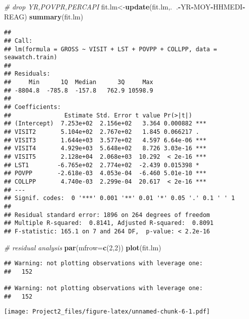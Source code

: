 \documentclass[]{article}
\newenvironment{Shaded}{\begin{snugshade}}{\end{snugshade}}
\newcommand{\KeywordTok}[1]{\textcolor[rgb]{0.13,0.29,0.53}{\textbf{#1}}}
\newcommand{\DataTypeTok}[1]{\textcolor[rgb]{0.13,0.29,0.53}{#1}}
\newcommand{\DecValTok}[1]{\textcolor[rgb]{0.00,0.00,0.81}{#1}}
\newcommand{\CommentTok}[1]{\textcolor[rgb]{0.56,0.35,0.01}{\textit{#1}}}
\newcommand{\OperatorTok}[1]{\textcolor[rgb]{0.81,0.36,0.00}{\textbf{#1}}}
\newcommand{\NormalTok}[1]{#1}
\begin{document}
\begin{Shaded}
\begin{Highlighting}[]
\CommentTok{# drop YR,POVPR,PERCAPI}
\NormalTok{fit.lm<-}\KeywordTok{update}\NormalTok{(fit.lm,.}\OperatorTok{~}\NormalTok{.}\OperatorTok{-}\NormalTok{YR}\OperatorTok{-}\NormalTok{MOY}\OperatorTok{-}\NormalTok{HHMEDI}\OperatorTok{-}\NormalTok{REAG)}
\KeywordTok{summary}\NormalTok{(fit.lm)}
\end{Highlighting}
\end{Shaded}

\begin{verbatim}
## 
## Call:
## lm(formula = GROSS ~ VISIT + LST + POVPP + COLLPP, data = seawatch.train)
## 
## Residuals:
##     Min      1Q  Median      3Q     Max 
## -8804.8  -785.8  -157.8   762.9 10598.9 
## 
## Coefficients:
##               Estimate Std. Error t value Pr(>|t|)    
## (Intercept)  7.253e+02  2.156e+02   3.364 0.000882 ***
## VISIT2       5.104e+02  2.767e+02   1.845 0.066217 .  
## VISIT3       1.644e+03  3.577e+02   4.597 6.64e-06 ***
## VISIT4       4.929e+03  5.648e+02   8.726 3.03e-16 ***
## VISIT5       2.128e+04  2.068e+03  10.292  < 2e-16 ***
## LST1        -6.765e+02  2.774e+02  -2.439 0.015398 *  
## POVPP       -2.618e-03  4.053e-04  -6.460 5.01e-10 ***
## COLLPP       4.740e-03  2.299e-04  20.617  < 2e-16 ***
## ---
## Signif. codes:  0 '***' 0.001 '**' 0.01 '*' 0.05 '.' 0.1 ' ' 1
## 
## Residual standard error: 1896 on 264 degrees of freedom
## Multiple R-squared:  0.8141, Adjusted R-squared:  0.8091 
## F-statistic: 165.1 on 7 and 264 DF,  p-value: < 2.2e-16
\end{verbatim}

\begin{Shaded}
\begin{Highlighting}[]
\CommentTok{# residual analysis}
\KeywordTok{par}\NormalTok{(}\DataTypeTok{mfrow=}\KeywordTok{c}\NormalTok{(}\DecValTok{2}\NormalTok{,}\DecValTok{2}\NormalTok{))}
\KeywordTok{plot}\NormalTok{(fit.lm)}
\end{Highlighting}
\end{Shaded}

\begin{verbatim}
## Warning: not plotting observations with leverage one:
##   152

## Warning: not plotting observations with leverage one:
##   152
\end{verbatim}

\texttt{[image: Project2\_files/figure-latex/unnamed-chunk-6-1.pdf]}
\end{document}
